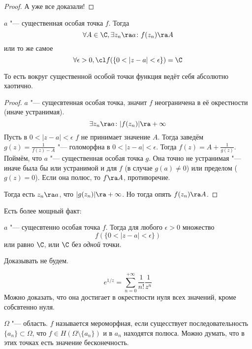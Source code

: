 \begin{proof}
	А уже все доказали!
\end{proof}

\begin{theorem}[Сохоцкого]
	$a$ "--- существенная особая точка $f$.
	Тогда
	\[ \forall A \in \C, \exists z_n \ra a\colon f(z_n) \ra A \]
	или то же самое
	\[ \forall \epsilon > 0, \cl f(\{0 < |z - a| < \epsilon\}) = \C \]
\end{theorem}
То есть вокруг существенной особой точки функция ведёт себя абсолютно хаотично.
\begin{proof}
	$a$ "--- сущесвтенная особая точка, значит $f$ неограничена в её окрестности (иначе устранимая).
	\[ \exists z_n \ra a\colon |f(z_n)| \ra +\infty \]
	Пусть в $0 < |z - a| < \epsilon$ $f$ не принимает значение $A$.
	Тогда заведём $g(z) = \frac1{f(z) - A}$ "--- голоморфна в $0 < |z - a| < \epsilon$.
	Тогда $f(z) = A + \frac1{g(z)}$.
	Поймём, что $a$ "--- существенная особая точка $g$.
	Она точно не устранимая "--- иначе была бы или устранимой и для $f$ (в случае $g(a) \ne 0$) или пределом ($g(z) = 0$).
	Если она полюс, то $f \ra A$, противоречие.

	Тогда есть $z_n \ra a$, что $|g(z_n)| \ra +\infty$.
	Но тогда опять $f(z_n) \ra A$.
\end{proof}

Есть более мощный факт:
\begin{theorem}[Пикара]
	$a$ "--- сущесвтенно особая точка $f$.
	Тогда для любого $\epsilon > 0$ множество
	\[ f(\{0 < |z - a| < \epsilon\}) \]
	или равно $\C$, или $\C$ без \textit{одной} точки.
\end{theorem}
Доказывать не будем.

\begin{exmp}
	\[ e^{1/z} = \sum_{n=0}^{+\infty} \frac1{n!} \frac1{z^n} \]
	Можно доказать, что она достигает в окрестности нуля всех значений, кроме собсвтенно нуля.
\end{exmp}

\begin{Def}
	$\Omega$ "--- область. $f$ называется мероморфная, если сущесствует последовательность $\{a_n\} \subset \Omega$,
	что $f \in H(\Omega \setminus \{a_n\})$ и в $a_n$ находятся полюса.
	Можно думать, что в этих точках есть значение бесконечность.
\end{Def}
